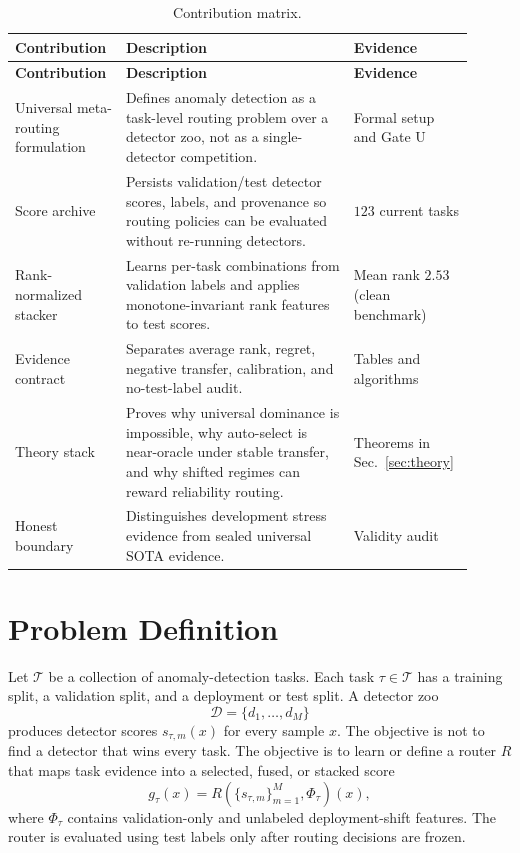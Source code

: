 \documentclass[11pt,titlepage]{article}
\newcommand{\gateu}{Gate U}
\begin{document}
\begin{longtable}{L{0.22\linewidth}L{0.47\linewidth}L{0.22\linewidth}}
\caption{Contribution matrix.}\label{tab:contrib}\\
\toprule
\textbf{Contribution} & \textbf{Description} & \textbf{Evidence} \\
\midrule
\endfirsthead
\toprule
\textbf{Contribution} & \textbf{Description} & \textbf{Evidence} \\
\midrule
\endhead
Universal meta-routing formulation & Defines anomaly detection as a task-level routing problem over a detector zoo, not as a single-detector competition. & Formal setup and \gateu{} \\
Score archive & Persists validation/test detector scores, labels, and provenance so routing policies can be evaluated without re-running detectors. & $123$ current tasks \\
Rank-normalized stacker & Learns per-task combinations from validation labels and applies monotone-invariant rank features to test scores. & Mean rank $2.53$ (clean benchmark) \\
Evidence contract & Separates average rank, regret, negative transfer, calibration, and no-test-label audit. & Tables and algorithms \\
Theory stack & Proves why universal dominance is impossible, why auto-select is near-oracle under stable transfer, and why shifted regimes can reward reliability routing. & Theorems in Sec.~\ref{sec:theory} \\
Honest boundary & Distinguishes development stress evidence from sealed universal SOTA evidence. & Validity audit \\
\bottomrule
\end{longtable}

\section{Problem Definition}

Let $\mathcal{T}$ be a collection of anomaly-detection tasks. Each task
$\tau\in\mathcal{T}$ has a training split, a validation split, and a deployment or
test split. A detector zoo
\[
\mathcal{D}=\{d_1,\ldots,d_M\}
\]
produces detector scores $s_{\tau,m}(x)$ for every sample $x$. The objective is
not to find a detector that wins every task. The objective is to learn or define a
router $R$ that maps task evidence into a selected, fused, or stacked score
\[
g_\tau(x)=R\left(\{s_{\tau,m}\}_{m=1}^{M}, \Phi_\tau\right)(x),
\]
where $\Phi_\tau$ contains validation-only and unlabeled deployment-shift
features. The router is evaluated using test labels only after routing decisions
are frozen.
\end{document}
